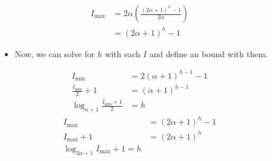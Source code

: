 \documentclass{beamer}
\begin{document}
\begin{frame}
    \begin{columns}
        \begin{column}{\textlecolumn}
            \begin{block}{}
                \vspace{-0.75cm}
                \[
                    \begin{aligned}
                        I_{\text{max}} &= 2\alpha \left(\frac{\left(2\alpha + 1\right)^h - 1}{2\alpha}\right) \\
                        &= \left(2\alpha + 1\right)^h - 1
                    \end{aligned}
                \]
                \begin{itemize}
                    \item Now, we can solve for \(h\) with each \(I\) and define an bound with them.
                \end{itemize}
                \[
                    \begin{aligned}
                        I_{\text{min}} &= 2\left(\alpha + 1\right)^{h - 1} - 1 \\
                        \frac{I_{\text{min}}}{2} + 1 &= \left(\alpha + 1\right)^{h - 1} \\
                        \log_{\alpha + 1} \frac{I_{\text{min}} + 1}{2} &= h
                    \end{aligned}
                \]
                \[
                    \begin{aligned}
                        I_{\text{max}} &= \left(2\alpha + 1\right)^h - 1 \\
                        I_{\text{max}} + 1 &= \left(2\alpha + 1\right)^h \\
                        \log_{2\alpha + 1} I_{\text{max}} + 1 = h
                    \end{aligned}
                \]
            \end{block}
        \end{column}
        \begin{column}{\textricolumn}
        \end{column}
    \end{columns}

    \framebreak


\end{frame}
\end{document}
